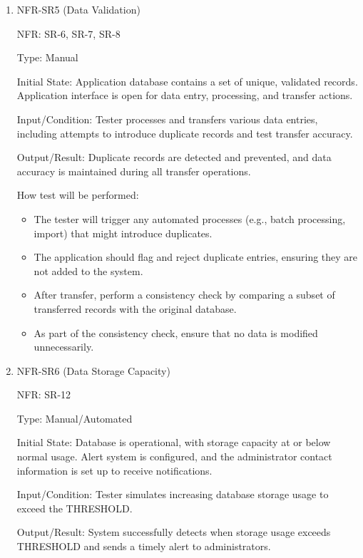 \documentclass[12pt, titlepage]{article}
\begin{document}
\begin{enumerate}
\item{NFR-SR5 (Data Validation)\\}
  
  NFR: SR-6, SR-7, SR-8
  
  Type: Manual
  
  Initial State: Application database contains a set of unique, validated
  records. Application interface is open for data entry, processing, and
  transfer actions.
  
  Input/Condition: Tester processes and transfers various data entries,
  including attempts to introduce duplicate records and test transfer accuracy.
  
  Output/Result: Duplicate records are detected and prevented, and data accuracy
  is maintained during all transfer operations.

  How test will be performed: 
  \begin{itemize}
    \item The tester will trigger any automated processes (e.g., batch
    processing, import) that might introduce duplicates.
    \item The application should flag and reject duplicate entries, ensuring
    they are not added to the system.
    \item After transfer, perform a consistency check by comparing a subset of
    transferred records with the original database.
    \item As part of the consistency check, ensure that no data is modified
    unnecessarily.
  \end{itemize}

\item{NFR-SR6 (Data Storage Capacity)\\}
  
  NFR: SR-12
  
  Type: Manual/Automated
  
  Initial State: Database is operational, with storage capacity at or below
  normal usage. Alert system is configured, and the administrator contact
  information is set up to receive notifications.

  Input/Condition: Tester simulates increasing database storage usage to exceed
  the THRESHOLD.
  
  Output/Result: System successfully detects when storage usage exceeds
  THRESHOLD and sends a timely alert to administrators.


\end{enumerate}
\end{document}
